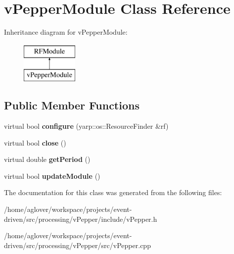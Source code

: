 \hypertarget{classvPepperModule}{}\section{v\+Pepper\+Module Class Reference}
\label{classvPepperModule}
Inheritance diagram for v\+Pepper\+Module\+:\begin{figure}[H]
\begin{center}
\leavevmode
\includegraphics[height=2.000000cm]{classvPepperModule}
\end{center}
\end{figure}
\subsection*{Public Member Functions}
\begin{DoxyCompactItemize}
\item 
virtual bool {\bfseries configure} (yarp\+::os\+::\+Resource\+Finder \&rf)\hypertarget{classvPepperModule_ae52c3e869d74022e64899a10a3f8053f}{}\label{classvPepperModule_ae52c3e869d74022e64899a10a3f8053f}

\item 
virtual bool {\bfseries close} ()\hypertarget{classvPepperModule_a62f696612df2410faf03b5a369da061b}{}\label{classvPepperModule_a62f696612df2410faf03b5a369da061b}

\item 
virtual double {\bfseries get\+Period} ()\hypertarget{classvPepperModule_a4553cffc356733698afcaf17bae7cfd0}{}\label{classvPepperModule_a4553cffc356733698afcaf17bae7cfd0}

\item 
virtual bool {\bfseries update\+Module} ()\hypertarget{classvPepperModule_a07ccde7835cfc92692b35a04666f4a4e}{}\label{classvPepperModule_a07ccde7835cfc92692b35a04666f4a4e}

\end{DoxyCompactItemize}


The documentation for this class was generated from the following files\+:\begin{DoxyCompactItemize}
\item 
/home/aglover/workspace/projects/event-\/driven/src/processing/v\+Pepper/include/v\+Pepper.\+h\item 
/home/aglover/workspace/projects/event-\/driven/src/processing/v\+Pepper/src/v\+Pepper.\+cpp\end{DoxyCompactItemize}
